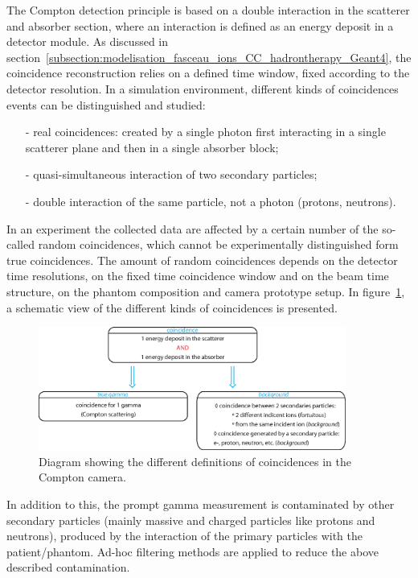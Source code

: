 The Compton detection principle is based on a double interaction in the scatterer and absorber section, where an interaction is defined as an energy deposit in a detector module. As discussed in section~\ref{subsection:modelisation_fasceau_ions_CC_hadrontherapy_Geant4}, the coincidence reconstruction relies on a defined time window, fixed according to the detector resolution. In a simulation environment, different kinds of coincidences events can be distinguished and studied: 
\begin{itemize}
\item[-] real coincidences: created by a single photon first interacting in a single scatterer plane and then in a single absorber block;
\item[-] quasi-simultaneous interaction of two secondary particles;
\item[-] double interaction of the same particle, not a photon (protons, neutrons).
\end{itemize}

In an experiment the collected data are affected by a certain number of the so-called random coincidences, which cannot be experimentally distinguished form true coincidences. The amount of random coincidences depends on the detector time resolutions, on the fixed time coincidence window and on the beam time structure, on the phantom composition and camera prototype setup. In figure~\ref{fig:fig_explication_coincidence_CC_simulation_Hadronth}, a schematic view of the different kinds of coincidences is presented.

\begin{figure}
  \centering
  \includegraphics[width=0.9\textwidth]{./Figure/Schema_coincidence_EN.eps}
  \caption{Diagram showing the different definitions of coincidences in the Compton camera.}
  \label{fig:fig_explication_coincidence_CC_simulation_Hadronth}
\end{figure}

In addition to this, the prompt gamma measurement is contaminated by other secondary particles (mainly massive and charged particles like protons and neutrons), produced by the interaction of the primary particles with the patient/phantom.
Ad-hoc filtering methods are applied to reduce the above described contamination.

